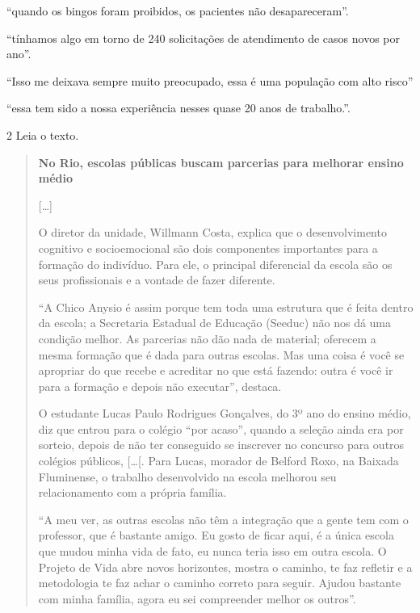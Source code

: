 \begin{escolha}
  ``quando os bingos foram proibidos, os pacientes não desapareceram''.
\item
  ``tínhamos algo em torno de 240 solicitações de atendimento de casos
  novos por ano''.
\item
  ``Isso me deixava sempre muito preocupado, essa é uma população com
  alto risco''
\item
  ``essa tem sido a nossa experiência nesses quase 20 anos de
  trabalho.''.
\end{escolha}


\num{2} Leia o texto.

\begin{quote}
\textbf{No Rio, escolas públicas buscam parcerias para melhorar ensino médio}

{[}\ldots{}{]}

O diretor da unidade, Willmann Costa, explica que o desenvolvimento
cognitivo e socioemocional são dois componentes importantes para a
formação do indivíduo. Para ele, o principal diferencial da escola são
os seus profissionais e a vontade de fazer diferente.

``A Chico Anysio é assim porque tem toda uma estrutura que é feita
dentro da escola; a Secretaria Estadual de Educação (Seeduc) não nos dá
uma condição melhor. As parcerias não dão nada de material; oferecem a
mesma formação que é dada para outras escolas. Mas uma coisa é você se
apropriar do que recebe e acreditar no que está fazendo: outra é você ir
para a formação e depois não executar'', destaca.

O estudante Lucas Paulo Rodrigues Gonçalves, do 3º ano do ensino médio,
diz que entrou para o colégio ``por acaso'', quando a seleção ainda era
por sorteio, depois de não ter conseguido se inscrever no concurso para
outros colégios públicos, {[}\ldots{}{[}. Para Lucas, morador de Belford
Roxo, na Baixada Fluminense, o trabalho desenvolvido na escola melhorou
seu relacionamento com a própria família.

``A meu ver, as outras escolas não têm a integração que a gente tem com
o professor, que é bastante amigo. Eu gosto de ficar aqui, é a única
escola que mudou minha vida de fato, eu nunca teria isso em outra
escola. O Projeto de Vida abre novos horizontes, mostra o caminho, te
faz refletir e a metodologia te faz achar o caminho correto para seguir.
Ajudou bastante com minha família, agora eu sei compreender melhor os
outros''.

\end{quote}

